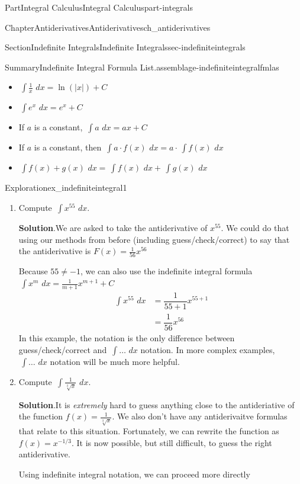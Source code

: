 \documentclass[oneside,10pt,]{tufte-book}
\newcommand{\blocktitlefont}{\relax}
\numberwithin{equation}{chapter}
\newcommand{\intdx}[1]{{\,\int#1\,\,dx}}
\newcommand{\amp}{&}
\begin{document}
\begin{partptx}{Part}{Integral Calculus}{}{Integral Calculus}{}{}{part-integrals}
\begin{chapterptx}{Chapter}{Antiderivatives}{}{Antiderivatives}{}{}{ch_antiderivatives}
\begin{sectionptx}{Section}{Indefinite Integrals}{}{Indefinite Integrals}{}{}{sec-indefiniteintegrals}
\begin{assemblage}{Summary}{Indefinite Integral Formula List.}{assemblage-indefiniteintegralfmlas}
\begin{itemize}[label=\textbullet]
\item{}\(\displaystyle \intdx{ \frac{1}{x} } = \ln(|x|) + C \)%
\item{}\(\displaystyle \intdx{ e^x } = e^x + C \)%
\item{}If \(a\) is a constant, \(\intdx{a} = ax + C\)%
\item{}If \(a\) is a constant, then \(\intdx{a\cdot f(x)} = a \cdot \intdx{f(x)}\)%
\item{}\(\displaystyle \intdx{f(x) + g(x)} = \intdx{f(x)} + \intdx{g(x)}\)%
\end{itemize}
%
\end{assemblage}
\begin{exploration}{Exploration}{}{ex_indefiniteintegral1}%
\begin{enumerate}[font=\bfseries,label=(\alph*),ref=\alph*]%
\item{}Compute \(\intdx{x^{55}} \).%
\par\smallskip%
\noindent\textbf{\blocktitlefont Solution}.\hypertarget{ex_indefiniteintegral1-1-2}{}\quad{}We are asked to take the antiderivative of \(x^{55}\).  We could do that using our methods from before (including guess\slash{}check\slash{}correct) to say that the antiderivative is \(F(x) = \frac{1}{56}x^{56}\)%
\par
Because \(55\neq -1\), we can also use the indefinite integral formula \(\intdx{x^m} = \frac{1}{m+1}x^{m+1} + C\)%
\begin{align*}
\intdx{ x^{55} } \amp = \dfrac{1}{55+1} x^{55+1} \\
\amp = \dfrac{1}{56} x^{56}
\end{align*}
In this example, the notation is the only difference between guess\slash{}check\slash{}correct and \(\intdx{\dots}\) notation. In more complex examples, \(\intdx{\dots}\) notation will be much more helpful.%
\item{}Compute \(\intdx{\frac{1}{\sqrt[3]{x}}} \).%
\par\smallskip%
\noindent\textbf{\blocktitlefont Solution}.\hypertarget{ex_indefiniteintegral1-2-2}{}\quad{}It is \emph{extremely} hard to guess anything close to the antideriative of the function \(f(x) = \frac{1}{\sqrt[3]{x}}\). We also don't have any antiderivaitve formulas that relate to this situation. Fortunately, we can rewrite the function as \(f(x) = x^{-1/3} \). It is now possible, but still difficult, to guess the right antiderivative.%
\par
Using indefinite integral notation, we can proceed more directly%
\begin{align*}

\end{align*}
\end{enumerate}
\end{exploration}
\end{sectionptx}
\end{chapterptx}
\end{partptx}
\end{document}
